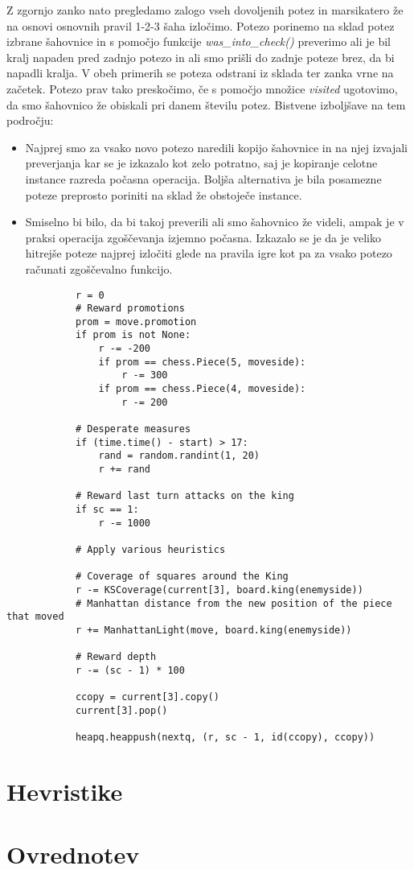 \documentclass[runningheads]{llncs}
\begin{document}
Z zgornjo zanko nato pregledamo zalogo vseh dovoljenih potez in marsikatero že na osnovi osnovnih pravil 1-2-3 šaha izločimo. Potezo porinemo na sklad potez izbrane šahovnice in s pomočjo funkcije \textit{was\_into\_check()} preverimo ali je bil kralj napaden pred zadnjo potezo in ali smo prišli do zadnje poteze brez, da bi napadli kralja. V obeh primerih se poteza odstrani iz sklada ter zanka vrne na začetek. Potezo prav tako preskočimo, če s pomočjo množice \textit{visited} ugotovimo, da smo šahovnico že obiskali pri danem številu potez. Bistvene izboljšave na tem področju:
\begin{itemize}
  \item Najprej smo za vsako novo potezo naredili kopijo šahovnice in na njej izvajali preverjanja kar se je izkazalo kot zelo potratno, saj je kopiranje celotne instance razreda počasna operacija. Boljša alternativa je bila posamezne poteze preprosto poriniti na sklad že obstoječe instance.
  \item Smiselno bi bilo, da bi takoj preverili ali smo šahovnico že videli, ampak je v praksi operacija zgoščevanja izjemno počasna. Izkazalo se je da je veliko hitrejše poteze najprej izločiti glede na pravila igre kot pa za vsako potezo računati zgoščevalno funkcijo.
\end{itemize}
\begin{lstlisting}
            r = 0
            # Reward promotions
            prom = move.promotion
            if prom is not None:
                r -= -200
                if prom == chess.Piece(5, moveside):
                    r -= 300
                if prom == chess.Piece(4, moveside):
                    r -= 200

            # Desperate measures
            if (time.time() - start) > 17:
                rand = random.randint(1, 20)
                r += rand

            # Reward last turn attacks on the king
            if sc == 1:
                r -= 1000

            # Apply various heuristics

            # Coverage of squares around the King
            r -= KSCoverage(current[3], board.king(enemyside))
            # Manhattan distance from the new position of the piece that moved
            r += ManhattanLight(move, board.king(enemyside))

            # Reward depth
            r -= (sc - 1) * 100

            ccopy = current[3].copy()
            current[3].pop()

            heapq.heappush(nextq, (r, sc - 1, id(ccopy), ccopy))
\end{lstlisting}

\section{Hevristike}

\section{Ovrednotev}

 
 
 
\end{document}
